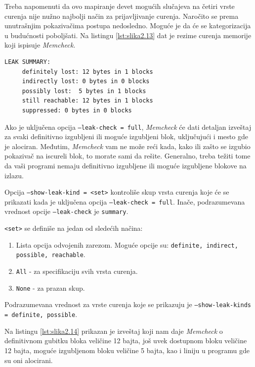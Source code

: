 \documentclass[12pt,oneside]{memoir}
\theoremstyle{plain}
\theoremstyle{definition}
\begin{document}
Treba napomenuti da ovo mapiranje devet mogućih slučajeva na četiri vrste curenja nije nužno najbolji način za prijavljivanje curenja. Naročito se prema unutrašnjim pokazivačima postupa nedosledno. Moguće je da će se kategorizacija u budućnosti poboljšati. Na listingu  \ref{lst:slika2.13} dat je rezime curenja memorije koji ispisuje \textit{Memcheck}.


\begin{lstlisting}[style=terminal,caption={Rezime curenja memorije}, label={lst:slika2.13},language={bash}] 
LEAK SUMMARY: 
     definitely lost: 12 bytes in 1 blocks 
     indirectly lost: 0 bytes in 0 blocks
     possibly lost:  5 bytes in 1 blocks 
     still reachable: 12 bytes in 1 blocks
     suppressed: 0 bytes in 0 blocks
\end{lstlisting}

Ako je uključena opcija \texttt{--leak-check = full}, \textit{Memcheck} će dati detaljan izveštaj za svaki definitivno izgubljeni ili moguće izgubljeni blok, uključujući i mesto gde je alociran. Međutim, \textit{Memcheck} vam ne može reći kada, kako ili zašto se izgubio pokazivač na iscureli blok, to morate sami da rešite. Generalno, treba težiti tome da vaši programi nemaju definitivno izgubljene ili moguće izgubljene blokove na izlazu.

Opcija \texttt{--show-leak-kind = <set>} kontroliše skup vrsta curenja koje će se prikazati kada je uključena opcija \texttt{--leak-check = full}. Inače, podrazumevana vrednost opcije \texttt{–leak-check} je \texttt{summary}.

\texttt{<set>} se definiše na jedan od sledećih načina:
\begin{enumerate}
\item Lista opcija odvojenih zarezom. Moguće opcije su: \texttt{definite, indirect, possible, reachable}.
\item \texttt{All} - za specifikaciju svih vrsta curenja.
\item \texttt{None} -  za prazan skup.
\end{enumerate}
Podrazumevana vrednost za vrste curenja koje se prikazuju je \texttt{--show-leak-kinds = definite, possible}.

Na listingu \ref{lst:slika2.14} prikazan je izveštaj koji nam daje \textit{Memcheck} o definitivnom gubitku bloka veličine 12 bajta, još uvek dostupnom bloku veličine 12 bajta, moguće izgubljenom bloku veličine 5 bajta, kao i liniju u programu gde su oni alocirani. 
\end{document}
